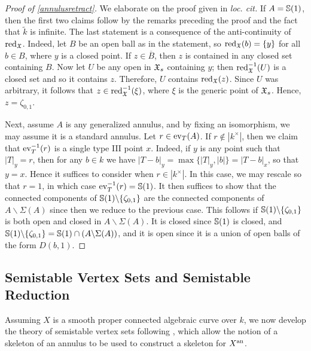 \begin{proof}[Proof of \cref{annulusretract}]
    We elaborate on the proof given in \textit{loc. cit.}
    If $A = \mathbb{S}(1)$, then the first two claims follow by the remarks preceding the proof and the fact that $\tilde{k}$ is infinite.
    The last statement is a consequence of the anti-continuity of $\operatorname{red}_{\mathfrak{X}}$.
    Indeed, let $B$ be an open ball as in the statement, so $\operatorname{red}_{\mathfrak{X}}(b) = \{y \}$ for all $b \in B$, where $y$ is a closed point.
    If $z \in \overline{B}$, then $z$ is contained in any closed set containing $B$.
    Now let $U$ be any open in $\mathfrak{X}_s$ containing $y$; then $\operatorname{red}^{-1}_{\mathfrak{X}}(U)$ is a closed set and so it contains $z$.
    Therefore, $U$ contains $\operatorname{red}_{\mathfrak{X}}(z)$.
    Since $U$ was arbitrary, it follows that $z \in \operatorname{red}^{-1}_{\mathfrak{X}}(\xi)$, where $\xi$ is the generic point of $\mathfrak{X}_s$.
    Hence, $z = \zeta_{0, 1}$.
    
    Next, assume $A$ is any generalized annulus, and by fixing an isomorphism, we may assume it is a standard annulus.
    Let $r \in \operatorname{ev}_{T}(A)$.
    If $r \not\in |k^{\times}|$, then we claim that $\operatorname{ev}_{T}^{-1}(r)$ is a single type III point $x$.
    Indeed, if $y$ is any point such that $|T|_y = r$, then for any $b \in k$ we have $|T - b|_y = \max \{ |T|_y, |b| \} = |T - b|_x$, so that $y = x$.
    Hence it suffices to consider when $r \in |k^{\times}|$. 
    In this case, we may rescale so that $r = 1$, in which case $\operatorname{ev}_{T}^{-1}(r) = \mathbb{S}(1)$.
    It then suffices to show that the connected components of $\mathbb{S}(1) \backslash \{ \zeta_{0, 1} \}$ are the connected components of $A \backslash \Sigma(A)$ since then we reduce to the previous case.
    This follows if $\mathbb{S}(1) \backslash \{ \zeta_{0, 1} \}$ is both open and closed in $A \backslash \Sigma(A)$.
    It is closed since $\mathbb{S}(1)$ is closed, and $\mathbb{S}(1) \backslash \{ \zeta_{0, 1} \} = \mathbb{S}(1) \cap (A \backslash \Sigma(A))$, and it is open since it is a union of open balls of the form $D(b, 1)$.
\end{proof}

\subsection{Semistable Vertex Sets and Semistable Reduction}

Assuming $X$ is a smooth proper connected algebraic curve over $k$, we now develop the theory of semistable vertex sets following \parencite[\S 3-4]{bpr}, which allow the notion of a skeleton of an annulus to be used to construct a skeleton for $X^{\text{an}}$.

